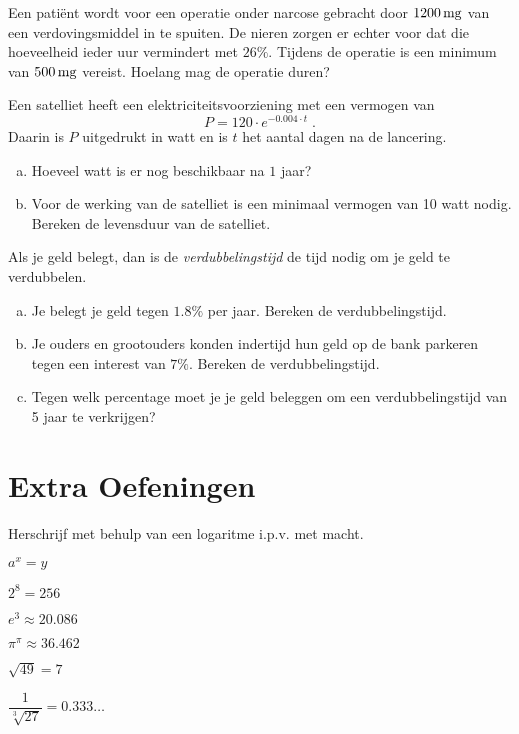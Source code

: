 \documentclass[12pt,twoside]{article}
\begin{document}
\begin{oefening}
Een patiënt wordt voor een operatie onder narcose gebracht door $1200 \mg$ van een verdovingsmiddel in te spuiten. De nieren zorgen er echter voor dat die hoeveelheid ieder uur vermindert met $26 \%$. Tijdens de operatie is een minimum van $500 \mg$ vereist. Hoelang mag de operatie duren?
\end{oefening}

\begin{oefening}
Een satelliet heeft een elektriciteitsvoorziening met een vermogen van
$$P=120\cdot e^{-0.004\cdot t}\;.$$
Daarin is $P$ uitgedrukt in watt en is $t$ het aantal dagen na de lancering.
\begin{enumerate}[(a)]
  \item Hoeveel watt is er nog beschikbaar na $1$ jaar?
  \item Voor de werking van de satelliet is een minimaal vermogen van 10 watt nodig. Bereken de levensduur van de satelliet.
\end{enumerate}
\end{oefening}

\begin{oefening}
Als je geld belegt, dan is de {\em verdubbelingstijd} de tijd nodig om je geld te verdubbelen.
\begin{enumerate}[(a)]
  \item Je belegt je geld tegen $1.8 \%$ per jaar. Bereken de verdubbelingstijd.
  \item Je ouders en grootouders konden indertijd hun geld op de bank parkeren tegen een interest van $7 \%$. Bereken de verdubbelingstijd.
  \item Tegen welk percentage moet je je geld beleggen om een verdubbelingstijd van 5 jaar te verkrijgen?
\end{enumerate}
\end{oefening}


\newpage
\section*{Extra Oefeningen}

\begin{oefening}
Herschrijf met behulp van een logaritme i.p.v. met macht.
\begin{exlist}{3}
  \item $a^x=y$
  \item $2^8=256$
  \item $e^3\approx20.086$
  \item $\pi^\pi\approx36.462$
  \item $\sqrt{49}=7$
  \item $\dfrac{1}{\sqrt[3]{27}}=0.333\ldots$
\end{exlist}
\end{oefening}
\end{document}
